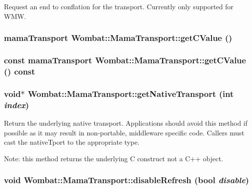 Request an end to conflation for the transport. Currently only supported for WMW. \hypertarget{classWombat_1_1MamaTransport_ae7856a9d37de06f0aebb051056b77d60}{
\subsubsection[{getCValue}]{\setlength{\rightskip}{0pt plus 5cm}mamaTransport Wombat::MamaTransport::getCValue ()}}
\label{classWombat_1_1MamaTransport_ae7856a9d37de06f0aebb051056b77d60}
\hypertarget{classWombat_1_1MamaTransport_a893a9111e4ea5adabaa12cf59f9b6fd8}{
\subsubsection[{getCValue}]{\setlength{\rightskip}{0pt plus 5cm}const mamaTransport Wombat::MamaTransport::getCValue () const}}
\label{classWombat_1_1MamaTransport_a893a9111e4ea5adabaa12cf59f9b6fd8}
\hypertarget{classWombat_1_1MamaTransport_ac32d12abca9fb3f16dc587802980120c}{
\subsubsection[{getNativeTransport}]{\setlength{\rightskip}{0pt plus 5cm}void$\ast$ Wombat::MamaTransport::getNativeTransport (int {\em index})}}
\label{classWombat_1_1MamaTransport_ac32d12abca9fb3f16dc587802980120c}


Return the underlying native transport. Applications should avoid this method if possible as it may result in non-\/portable, middleware specific code. Callers must cast the nativeTport to the appropriate type.

Note: this method returns the underlying C construct not a C++ object. \hypertarget{classWombat_1_1MamaTransport_ac69e1f4dd40f61fd321e403ec5e1d9ae}{
\subsubsection[{disableRefresh}]{\setlength{\rightskip}{0pt plus 5cm}void Wombat::MamaTransport::disableRefresh (bool {\em disable})}}
\label{classWombat_1_1MamaTransport_ac69e1f4dd40f61fd321e403ec5e1d9ae}


